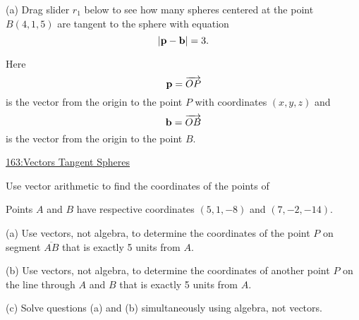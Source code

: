 \documentclass{ximera}
\begin{document}
\begin{question}  \label{Qdf4r4r5443}
(a) Drag slider $r_1$ below to see how many spheres centered at the point $B(4,1,5)$ are tangent to the sphere with equation
\[
        | {\bf p} - {\bf b} | = 3 .
\]


Here
\[
     {\bf p} = \overrightarrow{OP}
\]
is the vector from the origin to the point $P$ with coordinates $(x,y,z)$ and 
\[
   {\bf b} = \overrightarrow{OB}
\]
is the vector from the origin to the point $B$.



\begin{onlineOnly}
    \begin{center}
\end{center}
\end{onlineOnly}

\href{https://www.desmos.com/3d/5qzqbw87tv}{163:Vectors Tangent Spheres}

Use vector arithmetic to find the coordinates of the points of 

\end{question}








\begin{question} \label{Q45323240:Vectors}
Points $A$ and $B$ have respective coordinates $(5,1,-8)$ and $(7,-2,-14)$. 

(a) Use vectors, not algebra, to determine the coordinates of the point $P$ on segment $\overline{AB}$ that is exactly 5 units from $A$.

(b) Use vectors, not algebra, to determine the coordinates of another point $P$ on the line through $A$ and $B$ that is exactly 5 units from $A$.

(c) Solve questions (a) and (b) simultaneously using algebra, not vectors.

\end{question}
\end{document}
